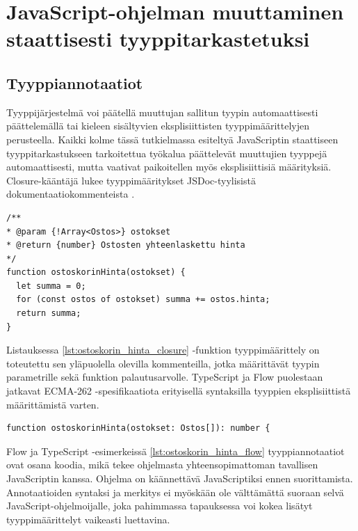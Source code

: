 \chapter{JavaScript-ohjelman muuttaminen staattisesti tyyppitarkastetuksi}

\section{Tyyppiannotaatiot}

Tyyppijärjestelmä voi päätellä muuttujan sallitun tyypin automaattisesti
päättelemällä tai kieleen sisältyvien eksplisiittisten tyyppimäärittelyjen
perusteella. Kaikki kolme tässä tutkielmassa esiteltyä JavaScriptin staattiseen
tyyppitarkastukseen tarkoitettua työkalua päättelevät muuttujien tyyppejä automaattisesti,
mutta vaativat paikoitellen myös eksplisiittisiä määrityksiä.
Closure-kääntäjä lukee
tyyppimääritykset JSDoc-tyylisistä dokumentaatiokommenteista \cite{annotatingJSforClosure}.

\begin{minipage}{\linewidth}
\begin{lstlisting}[caption={Esimerkki Closure-annotaatiosta funktiolle},label={lst:ostoskorin_hinta_closure}]
/**
* @param {!Array<Ostos>} ostokset
* @return {number} Ostosten yhteenlaskettu hinta
*/
function ostoskorinHinta(ostokset) {
  let summa = 0;
  for (const ostos of ostokset) summa += ostos.hinta;
  return summa;
}
\end{lstlisting}
\end{minipage}
Listauksessa \ref{lst:ostoskorin_hinta_closure} -funktion
tyyppimäärittely on toteutettu sen yläpuolella olevilla kommenteilla, jotka määrittävät
tyypin  parametrille sekä funktion palautusarvolle.
TypeScript ja Flow puolestaan jatkavat ECMA-262 -spesifikaatiota erityisellä syntaksilla
tyyppien eksplisiittistä määrittämistä varten. 

\begin{minipage}{\linewidth}
\begin{lstlisting}[caption={Esimerkki Flow tai TypeScript annotaatiosta funktiolle},label={lst:ostoskorin_hinta_flow}]
function ostoskorinHinta(ostokset: Ostos[]): number {
\end{lstlisting}
\end{minipage}

Flow ja TypeScript -esimerkeissä \ref{lst:ostoskorin_hinta_flow}
tyyppiannotaatiot ovat osana koodia, mikä
tekee ohjelmasta yhteensopimattoman tavallisen JavaScriptin kanssa. Ohjelma
on käännettävä JavaScriptiksi ennen suorittamista. Annotaatioiden
syntaksi ja merkitys ei myöskään ole välttämättä suoraan selvä
JavaScript-ohjelmoijalle, joka pahimmassa tapauksessa voi kokea lisätyt
tyyppimäärittelyt vaikeasti luettavina. 

